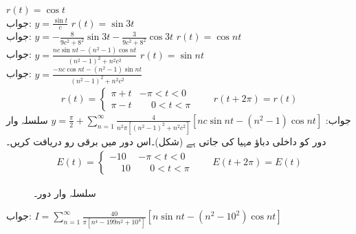 \quad
$r(t)=\cos t$\\
جواب:\quad
$y=\tfrac{\sin t}{c}$
\quad
$r(t)=\sin 3t$\\
جواب:\quad
$y=-\tfrac{8}{9c^2+8^2}\sin 3t-\tfrac{3}{9c^2+8^2}\cos 3t$
\quad
$r(t)=\cos nt$\\
جواب:\quad
$y=\tfrac{nc\sin nt-(n^2-1)\cos nt}{(n^2-1)^2+n^2c^2}$
\quad
$r(t)=\sin nt$\\
جواب:\quad
$y=\tfrac{-nc\cos nt-(n^2-1)\sin nt}{(n^2-1)^2+n^2c^2}$
\begin{align*}
r(t)=
\begin{cases}
\pi+t&-\pi<t<0\\
\pi-t&\phantom{-}0<t<\pi
\end{cases}
\quad \quad r(t+2\pi)=r(t)
\end{align*}
جواب:\quad
$y=\tfrac{\pi}{2}+\sum\limits_{n=1}^{\infty}\tfrac{4}{n^2\pi[(n^2-1)^2+n^2c^2]}[nc\sin nt-(n^2-1)\cos nt]$
\quad سلسلہ وار  دور کو   داخلی دباؤ مہیا کی جاتی ہے (شکل)۔اس دور میں برقی رو  دریافت کریں۔
\begin{align*}
E(t)=
\begin{cases}
-10&-\pi<t<0\\
\phantom{-}10&\phantom{-}0<t< \pi
\end{cases}
\quad \quad E(t+2\pi)=E(t)
\end{align*}
%
\begin{figure}
\centering
{}
\caption{سلسلہ وار دور۔}
\label{شکل_سوال_فورئیر_سلسلہ_وار_دور}
\end{figure}
جواب:\quad
$I=\sum\limits_{n=1}^{\infty}\tfrac{40}{\pi[n^4-199n^2+10^4]}[n\sin nt-(n^2-10^2)\cos nt]$

